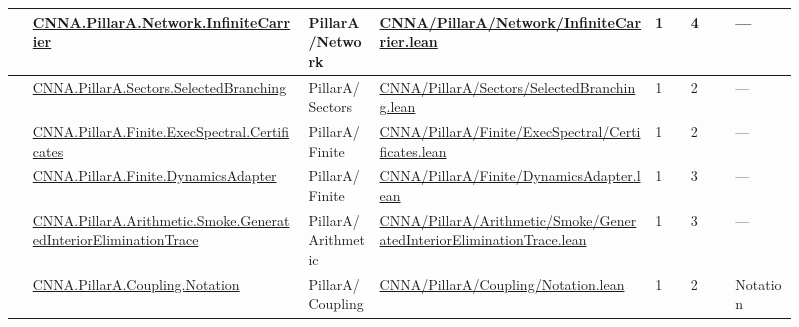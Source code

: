 \begin{longtable}{L{0.025\linewidth} L{0.315\linewidth} L{0.08\linewidth} L{0.315\linewidth} L{0.045\linewidth} L{0.055\linewidth} L{0.07\linewidth}}
\hline
{} & \href{run:repo_snapshot/CNNA/PillarA/Network/InfiniteCarrier.lean}{CNNA.\allowbreak{}PillarA.\allowbreak{}Network.\allowbreak{}InfiniteCarrier} & PillarA/\allowbreak{}Network & \href{run:repo_snapshot/CNNA/PillarA/Network/InfiniteCarrier.lean}{CNNA/\allowbreak{}PillarA/\allowbreak{}Network/\allowbreak{}InfiniteCarrier.\allowbreak{}lean} & 1 & 4 & ---\\
\hline
{} & \href{run:repo_snapshot/CNNA/PillarA/Sectors/SelectedBranching.lean}{CNNA.\allowbreak{}PillarA.\allowbreak{}Sectors.\allowbreak{}SelectedBranching} & PillarA/\allowbreak{}Sectors & \href{run:repo_snapshot/CNNA/PillarA/Sectors/SelectedBranching.lean}{CNNA/\allowbreak{}PillarA/\allowbreak{}Sectors/\allowbreak{}SelectedBranching.\allowbreak{}lean} & 1 & 2 & ---\\
\hline
{} & \href{run:repo_snapshot/CNNA/PillarA/Finite/ExecSpectral/Certificates.lean}{CNNA.\allowbreak{}PillarA.\allowbreak{}Finite.\allowbreak{}ExecSpectral.\allowbreak{}Certificates} & PillarA/\allowbreak{}Finite & \href{run:repo_snapshot/CNNA/PillarA/Finite/ExecSpectral/Certificates.lean}{CNNA/\allowbreak{}PillarA/\allowbreak{}Finite/\allowbreak{}ExecSpectral/\allowbreak{}Certificates.\allowbreak{}lean} & 1 & 2 & ---\\
\hline
{} & \href{run:repo_snapshot/CNNA/PillarA/Finite/DynamicsAdapter.lean}{CNNA.\allowbreak{}PillarA.\allowbreak{}Finite.\allowbreak{}DynamicsAdapter} & PillarA/\allowbreak{}Finite & \href{run:repo_snapshot/CNNA/PillarA/Finite/DynamicsAdapter.lean}{CNNA/\allowbreak{}PillarA/\allowbreak{}Finite/\allowbreak{}DynamicsAdapter.\allowbreak{}lean} & 1 & 3 & ---\\
\hline
{} & \href{run:repo_snapshot/CNNA/PillarA/Arithmetic/Smoke/GeneratedInteriorEliminationTrace.lean}{CNNA.\allowbreak{}PillarA.\allowbreak{}Arithmetic.\allowbreak{}Smoke.\allowbreak{}GeneratedInteriorEliminationTrace} & PillarA/\allowbreak{}Arithmetic & \href{run:repo_snapshot/CNNA/PillarA/Arithmetic/Smoke/GeneratedInteriorEliminationTrace.lean}{CNNA/\allowbreak{}PillarA/\allowbreak{}Arithmetic/\allowbreak{}Smoke/\allowbreak{}GeneratedInteriorEliminationTrace.\allowbreak{}lean} & 1 & 3 & ---\\
\hline
{} & \href{run:repo_snapshot/CNNA/PillarA/Coupling/Notation.lean}{CNNA.\allowbreak{}PillarA.\allowbreak{}Coupling.\allowbreak{}Notation} & PillarA/\allowbreak{}Coupling & \href{run:repo_snapshot/CNNA/PillarA/Coupling/Notation.lean}{CNNA/\allowbreak{}PillarA/\allowbreak{}Coupling/\allowbreak{}Notation.\allowbreak{}lean} & 1 & 2 & Notation\\

\end{longtable}
